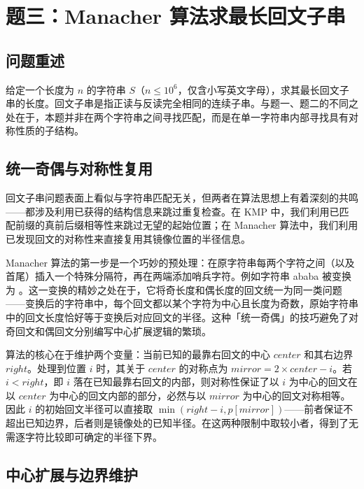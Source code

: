 \documentclass[12pt, a4paper]{academics}
\begin{document}
\section{题三：Manacher 算法求最长回文子串}

\subsection{问题重述}

给定一个长度为 $n$ 的字符串 $S$（$n \le 10^6$，仅含小写英文字母），求其最长回文子串的长度。回文子串是指正读与反读完全相同的连续子串。与题一、题二的不同之处在于，本题并非在两个字符串之间寻找匹配，而是在单一字符串内部寻找具有对称性质的子结构。

\subsection{统一奇偶与对称性复用}

回文子串问题表面上看似与字符串匹配无关，但两者在算法思想上有着深刻的共鸣——都涉及利用已获得的结构信息来跳过重复检查。在 KMP 中，我们利用已匹配前缀的真前后缀相等性来跳过无望的起始位置；在 Manacher 算法中，我们利用已发现回文的对称性来直接复用其镜像位置的半径信息。

Manacher 算法的第一步是一个巧妙的预处理：在原字符串每两个字符之间（以及首尾）插入一个特殊分隔符，再在两端添加哨兵字符。例如字符串 ababa 被变换为 。这一变换的精妙之处在于，它将奇长度和偶长度的回文统一为同一类问题——变换后的字符串中，每个回文都以某个字符为中心且长度为奇数，原始字符串中的回文长度恰好等于变换后对应回文的半径。这种「统一奇偶」的技巧避免了对奇回文和偶回文分别编写中心扩展逻辑的繁琐。

算法的核心在于维护两个变量：当前已知的最靠右回文的中心 $\mathit{center}$ 和其右边界 $\mathit{right}$。处理到位置 $i$ 时，其关于 $\mathit{center}$ 的对称点为 $\mathit{mirror} = 2 \times \mathit{center} - i$。若 $i < \mathit{right}$，即 $i$ 落在已知最靠右回文的内部，则对称性保证了以 $i$ 为中心的回文在以 $\mathit{center}$ 为中心的回文内部的部分，必然与以 $\mathit{mirror}$ 为中心的回文对称相等。因此 $i$ 的初始回文半径可以直接取 $\min(\mathit{right} - i, p[\mathit{mirror}])$——前者保证不超出已知边界，后者则是镜像处的已知半径。在这两种限制中取较小者，得到了无需逐字符比较即可确定的半径下界。

\subsection{中心扩展与边界维护}
\end{document}
